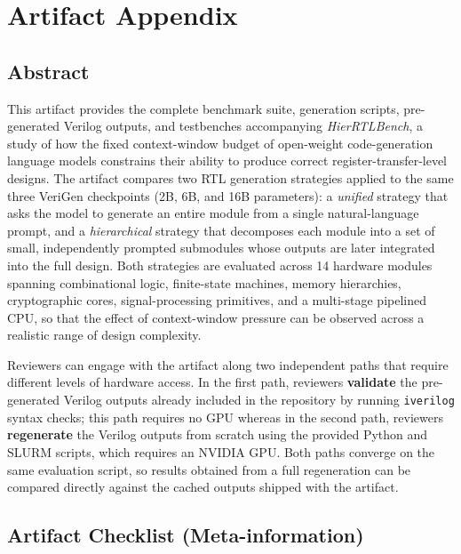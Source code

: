 \documentclass[sigplan,10pt,twocolumn]{acmart}
\begin{document}
\footnotesize
\sloppy

\appendix
\section{Artifact Appendix}

\subsection{Abstract}

This artifact provides the complete benchmark suite, generation scripts,
pre-generated Verilog outputs, and testbenches accompanying
\textit{HierRTLBench}, a study of how the fixed context-window budget of
open-weight code-generation language models constrains their ability to
produce correct register-transfer-level designs. The artifact compares two
RTL generation strategies applied to the same three VeriGen checkpoints
(2B, 6B, and 16B parameters): a \textit{unified} strategy that asks the
model to generate an entire module from a single natural-language prompt,
and a \textit{hierarchical} strategy that decomposes each module into a
set of small, independently prompted submodules whose outputs are later
integrated into the full design. Both strategies are evaluated across 14
hardware modules spanning combinational logic, finite-state machines,
memory hierarchies, cryptographic cores, signal-processing primitives, and
a multi-stage pipelined CPU, so that the effect of context-window pressure
can be observed across a realistic range of design complexity.

Reviewers can engage with the artifact along two independent paths that
require different levels of hardware access. In the first path, reviewers
\textbf{validate} the pre-generated Verilog outputs already included in the
repository by running \texttt{iverilog} syntax checks; this path requires no GPU whereas in the second path, reviewers
\textbf{regenerate} the Verilog outputs from scratch using the provided
Python and SLURM scripts, which requires an NVIDIA GPU. Both paths converge on the same evaluation
script, so results obtained from a full regeneration can be compared
directly against the cached outputs shipped with the artifact.

\subsection{Artifact Checklist (Meta-information)}
\end{document}
